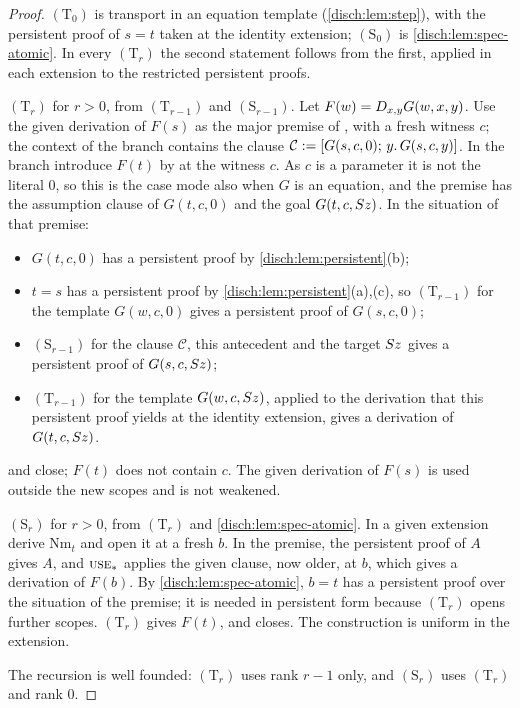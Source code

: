 \begin{proof}
$(\mathrm T_0)$ is transport in an equation template
(\cref{disch:lem:step}), with the persistent proof of $s=t$ taken at the
identity extension; $(\mathrm S_0)$ is \cref{disch:lem:spec-atomic}. In
every $(\mathrm T_r)$ the second statement follows from the first, applied
in each extension to the restricted persistent proofs.

$(\mathrm T_r)$ for $r>0$, from $(\mathrm T_{r-1})$ and
$(\mathrm S_{r-1})$. Let $F(w)=D_{x,y}G(w,x,y)$. Use the given derivation
of $F(s)$ as the major premise of , with a fresh witness $c$;
the context of the branch contains the clause
$\mathcal C\mathrel{:=}[G(s,c,0);\,y.\,G(s,c,y)]$. In the branch introduce
$F(t)$ by  at the witness $c$. As $c$ is a parameter it is
not the literal $0$, so this is the case mode also when $G$ is an
equation, and the premise has the assumption clause of $G(t,c,0)$ and the
goal $G(t,c,S z)$. In the situation of that premise:
\begin{itemize}
\item $G(t,c,0)$ has a persistent proof by
 \cref{disch:lem:persistent}(b);
\item $t=s$ has a persistent proof by \cref{disch:lem:persistent}(a),(c),
 so $(\mathrm T_{r-1})$ for the template $G(w,c,0)$ gives a persistent
 proof of $G(s,c,0)$;
\item $(\mathrm S_{r-1})$ for the clause $\mathcal C$, this antecedent and
 the target $S z$ gives a persistent proof of $G(s,c,S z)$;
\item $(\mathrm T_{r-1})$ for the template $G(w,c,S z)$, applied to the
 derivation that this persistent proof yields at the identity extension,
 gives a derivation of $G(t,c,S z)$.
\end{itemize}
 and  close; $F(t)$ does not contain $c$. The
given derivation of $F(s)$ is used outside the new scopes and is not
weakened.

$(\mathrm S_r)$ for $r>0$, from $(\mathrm T_r)$ and
\cref{disch:lem:spec-atomic}. In a given extension derive $\mathrm{Nm}_t$
and open it at a fresh $b$. In the premise, the persistent proof of $A$
gives $A$, and $\rulename{Use}_*$ applies the given clause, now older, at
$b$, which gives a derivation of $F(b)$. By \cref{disch:lem:spec-atomic},
$b=t$ has a persistent proof over the situation of the premise; it is
needed in persistent form because $(\mathrm T_r)$ opens further scopes.
$(\mathrm T_r)$ gives $F(t)$, and  closes. The construction
is uniform in the extension.

The recursion is well founded: $(\mathrm T_r)$ uses rank $r-1$ only, and
$(\mathrm S_r)$ uses $(\mathrm T_r)$ and rank $0$.
\end{proof}

